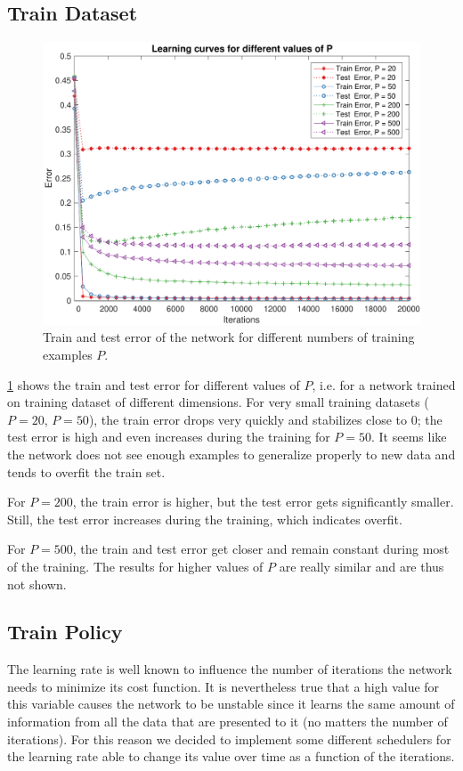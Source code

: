 \subsection{Train Dataset}
\begin{figure}[t]
	\centering
	\includegraphics[width=\columnwidth]{figures/error_ps}
    \caption{Train and test error of the network for different numbers of training examples $P$.}
	\label{fig:ps}
\end{figure}

\cref{fig:ps} shows the train and test error for different values of $P$, i.e. for a network trained on training dataset of different dimensions.
For very small training datasets ($P = 20$, $P = 50$), the train error drops very quickly and stabilizes close to $0$;
the test error is high and even increases during the training for $P = 50$.
It seems like the network does not see enough examples to generalize properly to new data and tends to overfit the train set.

For $P = 200$, the train error is higher, but the test error gets significantly smaller.
Still, the test error increases during the training, which indicates overfit.

For $P = 500$, the train and test error get closer and remain constant during most of the training.
The results for higher values of $P$ are really similar and are thus not shown.

\subsection{Train Policy}
The learning rate is well known to influence the number of iterations the network needs to minimize
its cost function. It is nevertheless true that a high value for this variable causes the network to
be unstable since it learns the same amount of information from all the data that are presented to it (no matters the number of iterations).
For this reason we decided to implement some different schedulers for the learning rate able to change its
value over time as a function of the iterations.

